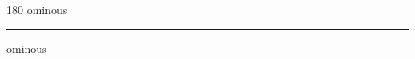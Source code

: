 
\begin{frame}
\begin{center}
\begin{turn}{180}
{\fontsize{2.5cm}{1em}\selectfont ominous}
\end{turn}
\vspace{1em}\par  
\hrule
\vspace{1em}\par  
{\fontsize{2.5cm}{1em}\selectfont ominous}
\end{center}
\end{frame}
